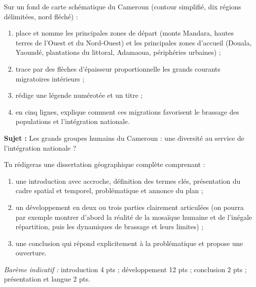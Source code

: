 \documentclass[11pt]{article}
\newcounter{popsec}
\newcounter{popsub}
\newcommand{\courssub}[1]{%
  \stepcounter{popsub}%
  \par\vspace{9pt}\noindent{\popxbold\fontsize{11.5}{13}\selectfont\color{popink}{\color{poporange}\thepopsec.\thepopsub}\hspace{6pt}#1}\par\nopagebreak\vspace{4pt}
}
\begin{document}
\begin{exercice}
Sur un fond de carte schématique du Cameroun (contour simplifié, dix régions délimitées, nord fléché) :
\begin{enumerate}
\item place et nomme les principales zones de départ (monts Mandara, hautes terres de l'Ouest et du Nord-Ouest) et les principales zones d'accueil (Douala, Yaoundé, plantations du littoral, Adamaoua, périphéries urbaines) ;
\item trace par des flèches d'épaisseur proportionnelle les grands courants migratoires intérieurs ;
\item rédige une légende numérotée et un titre ;
\item en cinq lignes, explique comment ces migrations favorisent le brassage des populations et l'intégration nationale.
\end{enumerate}
\end{exercice}

\courssub{Je me prépare au Bac}

\begin{exercice}
\textbf{Sujet :} \og Les grands groupes humains du Cameroun : une diversité au service de l'intégration nationale ? \fg

Tu rédigeras une dissertation géographique complète comprenant :
\begin{enumerate}
\item une introduction avec accroche, définition des termes clés, présentation du cadre spatial et temporel, problématique et annonce du plan ;
\item un développement en deux ou trois parties clairement articulées (on pourra par exemple montrer d'abord la réalité de la mosaïque humaine et de l'inégale répartition, puis les dynamiques de brassage et leurs limites) ;
\item une conclusion qui répond explicitement à la problématique et propose une ouverture.
\end{enumerate}
\emph{Barème indicatif :} introduction 4 pts ; développement 12 pts ; conclusion 2 pts ; présentation et langue 2 pts.
\end{exercice}
\end{document}
